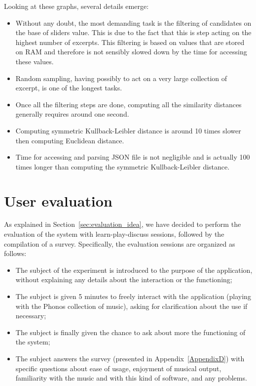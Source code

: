Looking at these graphs, several details emerge:
\begin{itemize}
\item Without any doubt, the most demanding task is the filtering of candidates on the base of sliders value. This is due to the fact that this is step acting on the highest number of excerpts. This filtering is based on values that are stored on RAM and therefore is not sensibly slowed down by the time for accessing these values. 
\item Random sampling, having possibly to act on a very large collection of excerpt, is one of the longest tasks.
\item Once all the filtering steps are done, computing all the similarity distances generally requires around one second. 
\item Computing symmetric Kullback-Leibler distance is around 10 times slower then computing Euclidean distance.
\item Time for accessing and parsing JSON file is not negligible and is actually 100 times longer than computing the symmetric Kullback-Leibler distance.
\end{itemize}

\section{User evaluation}
\label{sec:eval_results}
As explained in Section~\ref{sec:evaluation_idea}, we have decided to perform the evaluation of the system with learn-play-discuss sessions, followed by the compilation of a survey.
Specifically, the evaluation sessions are organized as follows:
\begin{itemize}
\item The subject of the experiment is introduced to the purpose of the application, without explaining any details about the interaction or the functioning;
\item The subject is given 5 minutes to freely interact with the application (playing with the Phonos collection of music), asking for clarification about the use if necessary;
\item The subject is finally given the chance to ask about more the functioning of the system;
\item The subject answers the survey (presented in Appendix~\ref{AppendixD}) with specific questions about ease of usage, enjoyment of musical output, familiarity with the music and with this kind of software, and any problems. 
\end{itemize}

